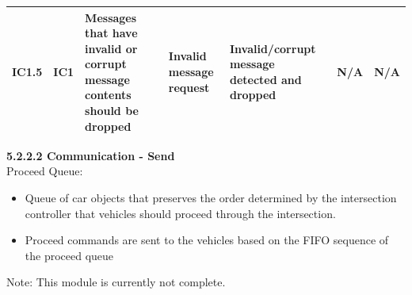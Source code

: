 \documentclass [10pt]{article}
\begin{document}
\begin{longtable}{ | p{ } | p{ } |  p{ } |  p{ } | p{ } | p{ } |  p{ } |}
    
    \multicolumn{1}{|c|}{IC1.5} 
    & \multicolumn{1}{c|}{IC1}
    & Messages that have invalid or corrupt message contents should be dropped
    & Invalid message \newline request
    & Invalid/corrupt message detected and dropped
    & N/A
    & \multicolumn{1}{|c|}{N/A}\\ \hline
     
    \end{longtable}
    
    \textbf{5.2.2.2 Communication - Send}  \\ 
    
    Proceed Queue:
\begin{itemize}[topsep=0pt]
    \itemsep -3pt
    \item Queue of car objects that preserves the order determined by the intersection controller that vehicles should proceed through the intersection. 
    \item Proceed commands are sent to the vehicles based on the FIFO sequence of the proceed queue\\
\end{itemize}

    Note: This module is currently not complete.\\
    
\end{document}
